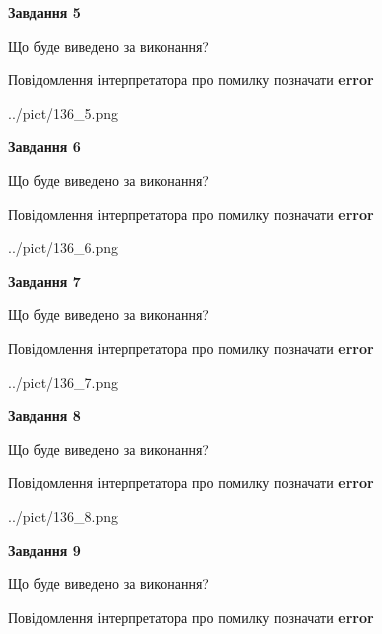 \documentclass[11pt, ukrainian]{article}
\begin{document}
{\begin {large}
{\begin {center}\textbf{Завдання 5}\end {center}}\par
Що буде виведено за виконання? \par
Повідомлення інтерпретатора про помилку позначати \textbf{error}

\begin{center}
	{../pict/136_5.png}
\end{center}
\newpage

{\begin {center}\textbf{Завдання 6}\end {center}}\par
Що буде виведено за виконання? \par
Повідомлення інтерпретатора про помилку позначати \textbf{error}

\begin{center}
	{../pict/136_6.png}
\end{center}
\newpage

{\begin {center}\textbf{Завдання 7}\end {center}}\par
Що буде виведено за виконання? \par
Повідомлення інтерпретатора про помилку позначати \textbf{error}

\begin{center}
	{../pict/136_7.png}
\end{center}
\newpage

{\begin {center}\textbf{Завдання 8}\end {center}}\par
Що буде виведено за виконання? \par
Повідомлення інтерпретатора про помилку позначати \textbf{error}

\begin{center}
	{../pict/136_8.png}
\end{center}
\newpage

{\begin {center}\textbf{Завдання 9}\end {center}}\par
Що буде виведено за виконання? \par
Повідомлення інтерпретатора про помилку позначати \textbf{error}


\end{large}}
\end{document}
